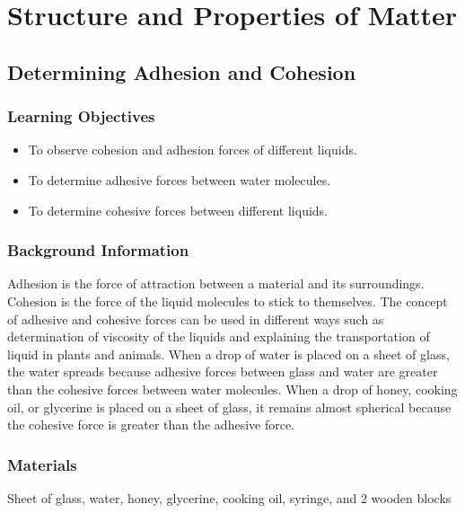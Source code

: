 \section{Structure and Properties of Matter}









\subsection{Determining Adhesion and Cohesion}

\subsubsection*{Learning Objectives}
\begin{itemize}
\item{To observe cohesion and adhesion forces of different liquids.}
\item{To determine adhesive forces between water molecules.}
\item{To determine cohesive forces between different liquids.}
\end{itemize}

\subsubsection*{Background Information}
Adhesion is the force of attraction between a material and its surroundings. Cohesion is the force of the liquid molecules to stick to themselves. The concept of adhesive and cohesive forces can be used in different ways such as determination of viscosity of the liquids and explaining the transportation of liquid in plants and animals. When a drop of water is placed on a sheet of glass, the water spreads because adhesive forces between glass and water are greater than the cohesive forces between water molecules. When a drop of honey, cooking oil, or glycerine is placed on a sheet of glass, it remains almost spherical because the cohesive force is greater than the adhesive force.

\subsubsection*{Materials}
Sheet of glass, water, honey, glycerine, cooking oil, syringe, and 2 wooden blocks

